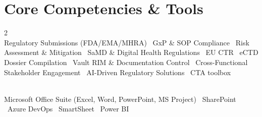 \documentclass[a4paper]{deedy-resume} %
\begin{document}

\vspace{-10pt}
\section{Core Competencies \& Tools}
\vspace{-10pt}
\begin{multicols}{2}
     \\
    \small %
    Regulatory Submissions (FDA/EMA/MHRA) \textbullet\ GxP \& SOP Compliance \textbullet\ Risk Assessment \& Mitigation \textbullet\ SaMD \& Digital Health Regulations \textbullet\ EU CTR \textbullet\ eCTD Dossier Compilation \textbullet\ Vault RIM \& Documentation Control \textbullet\ Cross-Functional Stakeholder Engagement \textbullet\ AI-Driven Regulatory Solutions \textbullet\ CTA toolbox

    \columnbreak

     \\
    \small
    Microsoft Office Suite (Excel, Word, PowerPoint, MS Project) \textbullet\ SharePoint \textbullet\ Azure DevOps \textbullet\ SmartSheet \textbullet\ Power BI
    \vspace{-2pt}
\end{multicols}
\vspace{-5pt}
\end{document}
